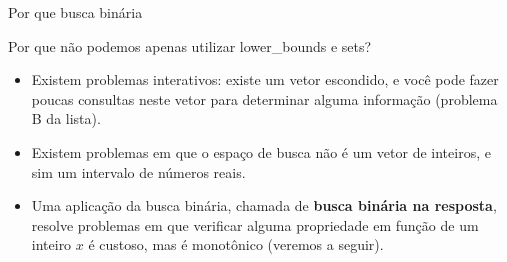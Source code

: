 \begin{frame}{Por que busca binária}

    Por que não podemos apenas utilizar lower\_bounds e sets?

    \begin{itemize}
        \item Existem problemas interativos: existe um vetor escondido, e você pode fazer poucas consultas neste vetor para determinar alguma informação (problema B da lista). \pause
        \item Existem problemas em que o espaço de busca não é um vetor de inteiros, e sim um intervalo de números reais. \pause
        \item Uma aplicação da busca binária, chamada de {\bf busca binária na resposta}, resolve problemas em que verificar alguma propriedade em função de um inteiro $x$ é custoso, mas é monotônico (veremos a seguir).
    \end{itemize}

\end{frame}

